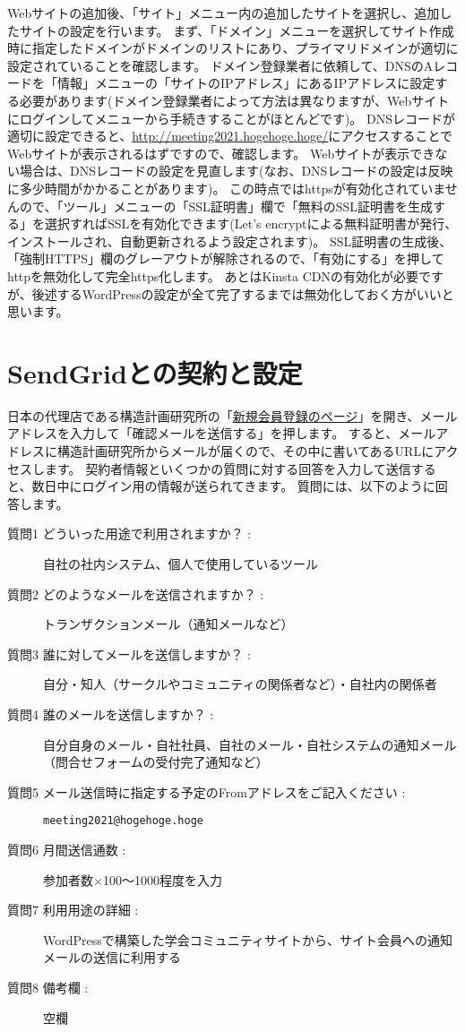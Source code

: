 \documentclass[titlepage,10pt,a4paper,uplatex]{jsbook}
\begin{document}
Webサイトの追加後、「サイト」メニュー内の追加したサイトを選択し、追加したサイトの設定を行います。
まず、「ドメイン」メニューを選択してサイト作成時に指定したドメインがドメインのリストにあり、プライマリドメインが適切に設定されていることを確認します。
ドメイン登録業者に依頼して、DNSのAレコードを「情報」メニューの「サイトのIPアドレス」にあるIPアドレスに設定する必要があります(ドメイン登録業者によって方法は異なりますが、Webサイトにログインしてメニューから手続きすることがほとんどです)。
DNSレコードが適切に設定できると、\url{http://meeting2021.hogehoge.hoge/}にアクセスすることでWebサイトが表示されるはずですので、確認します。
Webサイトが表示できない場合は、DNSレコードの設定を見直します(なお、DNSレコードの設定は反映に多少時間がかかることがあります)。
この時点ではhttpsが有効化されていませんので、「ツール」メニューの「SSL証明書」欄で「無料のSSL証明書を生成する」を選択すればSSLを有効化できます(Let's encryptによる無料証明書が発行、インストールされ、自動更新されるよう設定されます)。
SSL証明書の生成後、「強制HTTPS」欄のグレーアウトが解除されるので、「有効にする」を押してhttpを無効化して完全https化します。
あとはKinsta CDNの有効化が必要ですが、後述するWordPressの設定が全て完了するまでは無効化しておく方がいいと思います。

\section{SendGridとの契約と設定}

日本の代理店である構造計画研究所の「\href{https://sendgrid.kke.co.jp/app?p=signup.index}{新規会員登録のページ}」を開き、メールアドレスを入力して「確認メールを送信する」を押します。
すると、メールアドレスに構造計画研究所からメールが届くので、その中に書いてあるURLにアクセスします。
契約者情報といくつかの質問に対する回答を入力して送信すると、数日中にログイン用の情報が送られてきます。
質問には、以下のように回答します。

\begin{description}
\item[質問1 どういった用途で利用されますか？ : ] 自社の社内システム、個人で使用しているツール
\item[質問2 どのようなメールを送信されますか？ : ] トランザクションメール（通知メールなど）
\item[質問3 誰に対してメールを送信しますか？ : ] 自分・知人（サークルやコミュニティの関係者など）・自社内の関係者
\item[質問4 誰のメールを送信しますか？ : ] 自分自身のメール・自社社員、自社のメール・自社システムの通知メール（問合せフォームの受付完了通知など）
\item[質問5 メール送信時に指定する予定のFromアドレスをご記入ください : ] \texttt{meeting2021@hogehoge.hoge}
\item[質問6 月間送信通数 : ] 参加者数×100～1000程度を入力
\item[質問7 利用用途の詳細 : ] WordPressで構築した学会コミュニティサイトから、サイト会員への通知メールの送信に利用する
\item[質問8 備考欄 : ] 空欄
\end{description}
\end{document}
